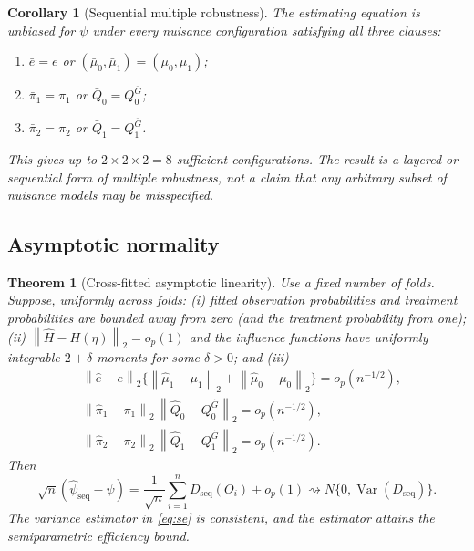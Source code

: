 \documentclass[11pt]{article}
\newtheorem{theorem}{Theorem}
\newtheorem{corollary}{Corollary}
\theoremstyle{definition}
\newcommand{\Var}{\operatorname{Var}}
\newcommand{\norm}[1]{\left\lVert #1\right\rVert_2}
\newcommand{\1}{\mathbf{1}}
\newcommand{\seq}{\mathrm{seq}}
\begin{document}
\begin{corollary}[Sequential multiple robustness]\label{cor:robustness}
The estimating equation is unbiased for $\psi$ under every nuisance configuration satisfying all three clauses:
\begin{enumerate}[label=(\roman*),leftmargin=*]
\item $\bar e=e$ or $(\bar\mu_0,\bar\mu_1)=(\mu_0,\mu_1)$;
\item $\bar\pi_1=\pi_1$ or $\bar Q_0=Q_0^{\bar G}$;
\item $\bar\pi_2=\pi_2$ or $\bar Q_1=Q_1^{\bar G}$.
\end{enumerate}
This gives up to $2\times2\times2=8$ sufficient configurations. The result is a layered or sequential form of multiple robustness, not a claim that any arbitrary subset of nuisance models may be misspecified.
\end{corollary}

\subsection{Asymptotic normality}

\begin{theorem}[Cross-fitted asymptotic linearity]\label{thm:asymptotics}
Use a fixed number of folds. Suppose, uniformly across folds: (i) fitted observation probabilities and treatment probabilities are bounded away from zero (and the treatment probability from one); (ii) $\norm{\widehat H-H(\eta)}=o_p(1)$ and the influence functions have uniformly integrable $2+\delta$ moments for some $\delta>0$; and (iii)
\begin{align*}
&\norm{\widehat e-e}
\{\norm{\widehat\mu_1-\mu_1}+\norm{\widehat\mu_0-\mu_0}\}
=o_p(n^{-1/2}),\\
&\norm{\widehat\pi_1-\pi_1}\,
\norm{\widehat Q_0-Q_0^{\widehat G}}=o_p(n^{-1/2}),\\
&\norm{\widehat\pi_2-\pi_2}\,
\norm{\widehat Q_1-Q_1^{\widehat G}}=o_p(n^{-1/2}).
\end{align*}
Then
\[
\sqrt n(\widehat\psi_{\seq}-\psi)
=\frac{1}{\sqrt n}\sum_{i=1}^nD_{\seq}(O_i)+o_p(1)
\rightsquigarrow N\{0,\Var(D_{\seq})\}.
\]
The variance estimator in \cref{eq:se} is consistent, and the estimator attains the semiparametric efficiency bound.
\end{theorem}
\end{document}
